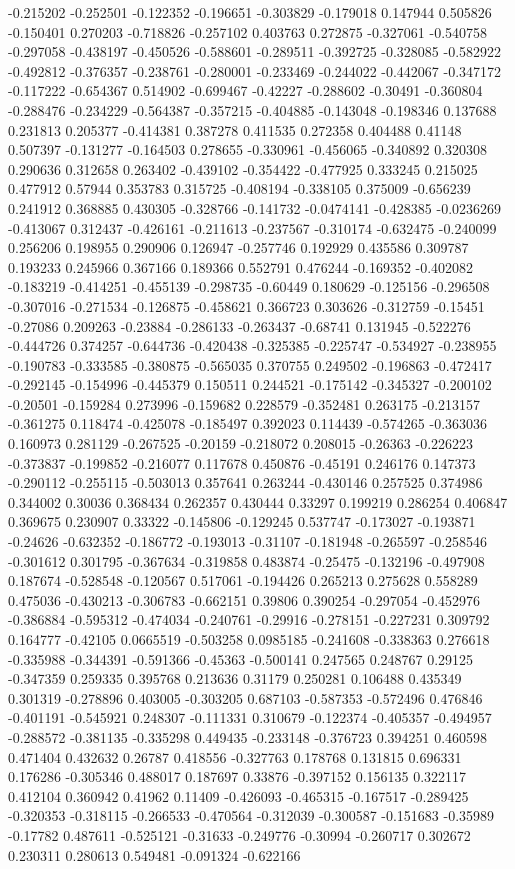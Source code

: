 -0.215202 -0.252501 -0.122352 -0.196651 -0.303829 -0.179018 0.147944 0.505826 -0.150401 0.270203 -0.718826 -0.257102 0.403763 0.272875 -0.327061 -0.540758 -0.297058 -0.438197 -0.450526 -0.588601 -0.289511 -0.392725 -0.328085 -0.582922 -0.492812 -0.376357 -0.238761 -0.280001 -0.233469 -0.244022 -0.442067 -0.347172 -0.117222 -0.654367 0.514902 -0.699467 -0.42227 -0.288602 -0.30491 -0.360804 -0.288476 -0.234229 -0.564387 -0.357215 -0.404885 -0.143048 -0.198346 0.137688 0.231813 0.205377 -0.414381 0.387278 0.411535 0.272358 0.404488 0.41148 0.507397 -0.131277 -0.164503 0.278655 -0.330961 -0.456065 -0.340892 0.320308 0.290636 0.312658 0.263402 -0.439102 -0.354422 -0.477925 0.333245 0.215025 0.477912 0.57944 0.353783 0.315725 -0.408194 -0.338105 0.375009 -0.656239 0.241912 0.368885 0.430305 -0.328766 -0.141732 -0.0474141 -0.428385 -0.0236269 -0.413067 0.312437 -0.426161 -0.211613 -0.237567 -0.310174 -0.632475 -0.240099 0.256206 0.198955 0.290906 0.126947 -0.257746 0.192929 0.435586 0.309787 0.193233 0.245966 0.367166 0.189366 0.552791 0.476244 -0.169352 -0.402082 -0.183219 -0.414251 -0.455139 -0.298735 -0.60449 0.180629 -0.125156 -0.296508 -0.307016 -0.271534 -0.126875 -0.458621 0.366723 0.303626 -0.312759 -0.15451 -0.27086 0.209263 -0.23884 -0.286133 -0.263437 -0.68741 0.131945 -0.522276 -0.444726 0.374257 -0.644736 -0.420438 -0.325385 -0.225747 -0.534927 -0.238955 -0.190783 -0.333585 -0.380875 -0.565035 0.370755 0.249502 -0.196863 -0.472417 -0.292145 -0.154996 -0.445379 0.150511 0.244521 -0.175142 -0.345327 -0.200102 -0.20501 -0.159284 0.273996 -0.159682 0.228579 -0.352481 0.263175 -0.213157 -0.361275 0.118474 -0.425078 -0.185497 0.392023 0.114439 -0.574265 -0.363036 0.160973 0.281129 -0.267525 -0.20159 -0.218072 0.208015 -0.26363 -0.226223 -0.373837 -0.199852 -0.216077 0.117678 0.450876 -0.45191 0.246176 0.147373 -0.290112 -0.255115 -0.503013 0.357641 0.263244 -0.430146 0.257525 0.374986 0.344002 0.30036 0.368434 0.262357 0.430444 0.33297 0.199219 0.286254 0.406847 0.369675 0.230907 0.33322 -0.145806 -0.129245 0.537747 -0.173027 -0.193871 -0.24626 -0.632352 -0.186772 -0.193013 -0.31107 -0.181948 -0.265597 -0.258546 -0.301612 0.301795 -0.367634 -0.319858 0.483874 -0.25475 -0.132196 -0.497908 0.187674 -0.528548 -0.120567 0.517061 -0.194426 0.265213 0.275628 0.558289 0.475036 -0.430213 -0.306783 -0.662151 0.39806 0.390254 -0.297054 -0.452976 -0.386884 -0.595312 -0.474034 -0.240761 -0.29916 -0.278151 -0.227231 0.309792 0.164777 -0.42105 0.0665519 -0.503258 0.0985185 -0.241608 -0.338363 0.276618 -0.335988 -0.344391 -0.591366 -0.45363 -0.500141 0.247565 0.248767 0.29125 -0.347359 0.259335 0.395768 0.213636 0.31179 0.250281 0.106488 0.435349 0.301319 -0.278896 0.403005 -0.303205 0.687103 -0.587353 -0.572496 0.476846 -0.401191 -0.545921 0.248307 -0.111331 0.310679 -0.122374 -0.405357 -0.494957 -0.288572 -0.381135 -0.335298 0.449435 -0.233148 -0.376723 0.394251 0.460598 0.471404 0.432632 0.26787 0.418556 -0.327763 0.178768 0.131815 0.696331 0.176286 -0.305346 0.488017 0.187697 0.33876 -0.397152 0.156135 0.322117 0.412104 0.360942 0.41962 0.11409 -0.426093 -0.465315 -0.167517 -0.289425 -0.320353 -0.318115 -0.266533 -0.470564 -0.312039 -0.300587 -0.151683 -0.35989 -0.17782 0.487611 -0.525121 -0.31633 -0.249776 -0.30994 -0.260717 0.302672 0.230311 0.280613 0.549481 -0.091324 -0.622166 